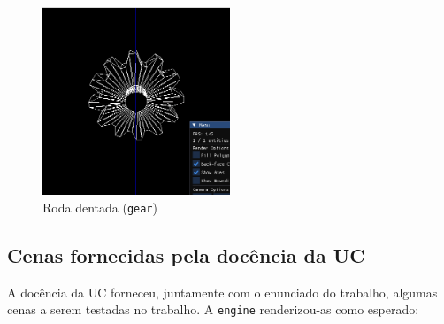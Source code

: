 \documentclass[12pt, a4paper]{article}
\begin{document}
\begin{figure}[H]
    \centering
    \begin{minipage}{0.48\textwidth}
        \centering
        \includegraphics[width=0.5\textwidth]{res/phase2/results/Gear.png}
        \caption{Roda dentada (\texttt{gear})}
    \end{minipage}\hfill
\end{figure}

\subsection{Cenas fornecidas pela docência da UC}

A docência da UC forneceu, juntamente com o enunciado do trabalho, algumas cenas a serem testadas no
trabalho. A \texttt{engine} renderizou-as como esperado:
\end{document}
